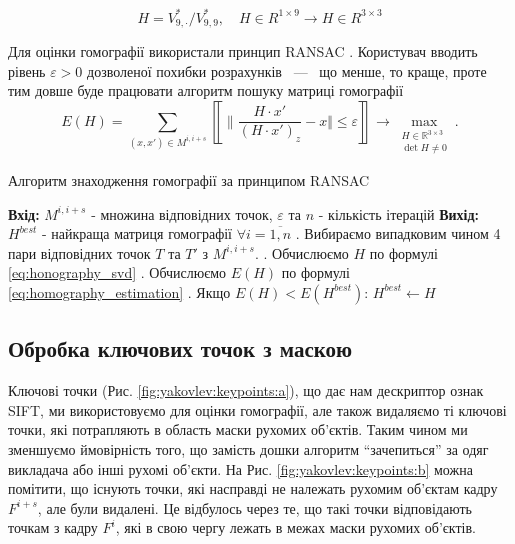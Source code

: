 \begin{equation}
    H = V^{*}_{9,\cdot }/V^{*}_{9,9},\quad H \in R^{1 \times 9} \rightarrow H \in R^{3 \times 3}
    \label{eq:honography_svd}
\end{equation}

Для оцінки гомографії використали принцип RANSAC \cite{ransac}.
Користувач вводить рівень \(\varepsilon > 0\)
дозволеної похибки розрахунків ~---~ що менше, то краще, проте тим довше
буде працювати алгоритм пошуку матриці гомографії
\begin{equation}
    E(H) = \sum_{(x,x') \in M^{i,i+s}}
    \left\llbracket \|
    \frac{H\cdot x'}{(H\cdot x')_z} - x
    \Vert \leq \varepsilon
    \right\rrbracket
    \to \max\limits_{\substack{H \in \mathbb{R}^{3 \times 3} \\ \det{H} \neq 0}}.
    \label{eq:homography_estimation}
\end{equation}

\begin{algorithm}[H]
    \caption{Алгоритм знаходження гомографії за принципом RANSAC}
    \begin{algorithmic}
        \State \textbf{Вхід:} $M^{i,i+s}$ - множина відповідних точок, $\varepsilon$ та $n$ - кількість ітерацій
        \State \textbf{Вихід:} $H^{best}$ - найкраща матриця гомографії
        \State $\forall i = \overline{1,n}$
        \State {}. Вибираємо випадковим чином 4 пари відповідних точок $T$ та $T'$ з $M^{i,i+s}$.
        \State {}. Обчислюємо $H$ по формулі \eqref{eq:honography_svd}
        \State {}. Обчислюємо $E(H)$ по формулі \eqref{eq:homography_estimation}
        \State {}. Якщо  $E(H) < E(H^{best})$:
        \State \qquad $H^{best} \gets H$
    \end{algorithmic}
\end{algorithm}

\subsection{Обробка ключових точок з маскою}

Ключові точки (Рис. \ref{fig:yakovlev:keypoints:a}), що дає нам дескриптор ознак SIFT, ми
використовуємо для оцінки гомографії, але також видаляємо ті ключові
точки, які потрапляють в область маски рухомих об'єктів.
Таким чином ми зменшуємо ймовірність того, що замість дошки алгоритм ``зачепиться'' за одяг
викладача або інші рухомі об'єкти. На Рис. \ref{fig:yakovlev:keypoints:b} можна помітити, що
існують точки, які насправді не належать рухомим об'єктам кадру
\(F^{i + s}\), але були видалені. Це відбулось через те, що такі точки
відповідають точкам з кадру \(F^{i}\), які в свою чергу лежать в межах маски рухомих об'єктів.

